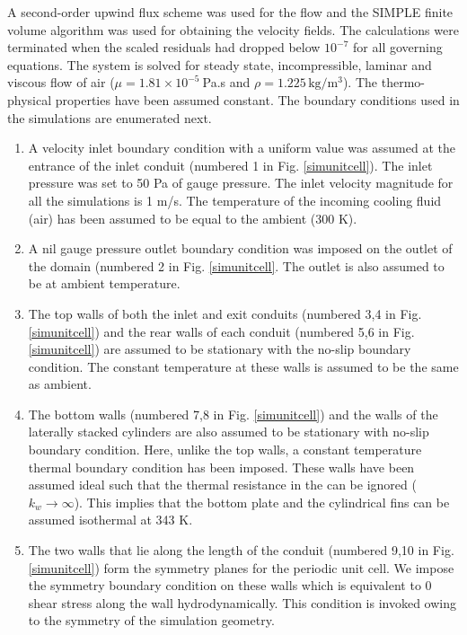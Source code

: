 \documentclass[twocolumn,10pt,cleanfoot]{ihmtc}
\begin{document}
%
A second-order upwind flux scheme was used for the flow and the SIMPLE finite volume algorithm was used for obtaining the velocity fields. The calculations were terminated when the scaled residuals had dropped below ${{10}^{-7}}$ for all governing equations. The system is solved for steady state, incompressible, laminar and viscous flow of air ($\mu =1.81\times {{10}^{-5}}~$Pa.s and $\rho =1.225\,\text{kg/}{{\text{m}}^{3}}$). The thermo-physical properties have been assumed constant. 
%
The boundary conditions used in the simulations are enumerated next.
\begin{enumerate}     
\item {A velocity inlet boundary condition with a uniform value was assumed at the entrance of the inlet conduit (numbered 1 in Fig. \ref{simunitcell}). The inlet pressure was set to 50 Pa of gauge pressure. The inlet velocity magnitude for all the simulations is 1 m/s. The temperature of the incoming cooling fluid (air) has been assumed to be equal to the ambient (300 K).}
%         
\item{A nil gauge pressure outlet boundary condition was imposed on the outlet of the domain (numbered 2  in Fig. \ref{simunitcell}. The outlet is also assumed to be at ambient temperature.}
%         
\item{The top walls of both the inlet and exit conduits (numbered 3,4 in Fig. \ref{simunitcell}) and the rear walls of each conduit (numbered 5,6 in Fig. \ref{simunitcell}) are assumed to be stationary with the no-slip boundary condition. The constant temperature at these walls is assumed to be the same as ambient.}
%
\item{The bottom walls (numbered 7,8 in Fig. \ref{simunitcell}) and the walls of the laterally stacked cylinders are also assumed to be stationary with no-slip boundary condition. Here, unlike the top walls, a constant temperature thermal boundary condition has been imposed. These walls have been assumed ideal such that the thermal resistance in the can be ignored ($k_w \rightarrow \infty$). This implies that the bottom plate and the cylindrical fins can be assumed isothermal at 343 K.}
%       
\item{The two walls that lie along the length of the conduit (numbered 9,10 in Fig. \ref{simunitcell}) form the symmetry planes for the periodic unit cell. We impose the symmetry boundary condition on these walls which is equivalent to 0 shear stress along the wall hydrodynamically. This condition is invoked owing to the symmetry of the simulation geometry.}      
\end{enumerate}
%
\end{document}
